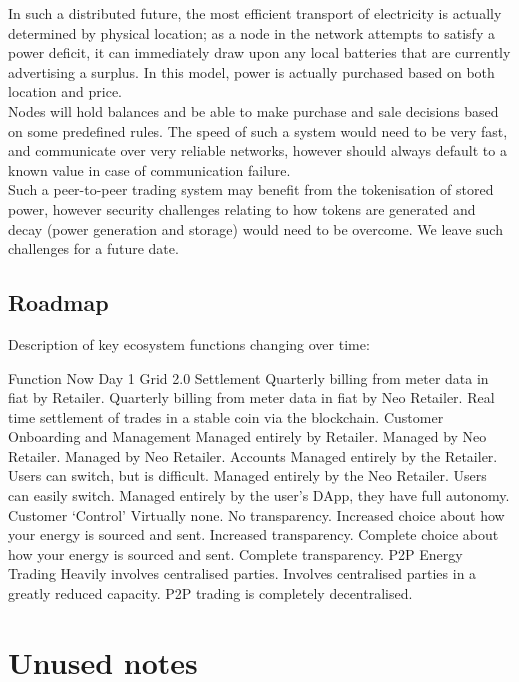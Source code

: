 \documentclass{article}
\theoremstyle{definition}
\theoremstyle{plain} %
\begin{document}
\noindent In such a distributed future, the most efficient transport of electricity is actually determined by physical location; as a node in the network attempts to satisfy a power deficit, it can immediately draw upon any local batteries that are currently advertising a surplus. In this model, power is actually purchased based on both location and price.\\

\noindent Nodes will hold balances and be able to make purchase and sale decisions based on some predefined rules. The speed of such a system would need to be very fast, and communicate over very reliable networks, however should always default to a known value in case of communication failure.\\

\noindent Such a peer-to-peer trading system may benefit from the tokenisation of stored power, however security challenges relating to how tokens are generated and decay (power generation and storage) would need to be overcome. We leave such challenges for a future date.\\


\pagebreak
\subsection{Roadmap}

Description of key ecosystem functions changing over time:

Function
Now
Day 1 
Grid 2.0
Settlement
Quarterly billing from meter data in fiat by Retailer.
Quarterly billing from meter data in fiat by Neo Retailer.
Real time settlement of trades in a stable coin via the blockchain.
Customer Onboarding and Management
Managed entirely by Retailer.
Managed by Neo Retailer.
Managed by Neo Retailer.
Accounts
Managed entirely by the Retailer. Users can switch, but is difficult.
Managed entirely by the Neo Retailer. Users can easily switch.
Managed entirely by the user’s DApp, they have full autonomy.
Customer ‘Control’
Virtually none. No transparency.
Increased choice about how your energy is sourced and sent. Increased transparency.
Complete choice about how your energy is sourced and sent. Complete transparency.
P2P Energy Trading
Heavily involves centralised parties.
Involves centralised parties in a greatly reduced capacity.
P2P trading is completely decentralised.




\pagebreak
\section{Unused notes}
\end{document}
